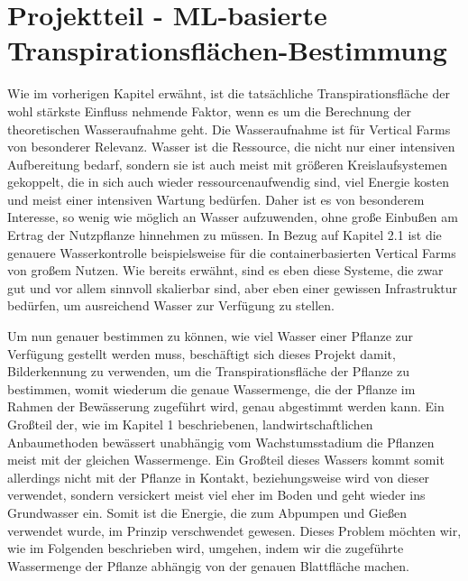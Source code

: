 \section{Projektteil - ML-basierte Transpirationsflächen-Bestimmung}
Wie im vorherigen Kapitel erwähnt, ist die tatsächliche Transpirationsfläche der wohl stärkste Einfluss nehmende Faktor, wenn es um die Berechnung der theoretischen Wasseraufnahme geht. Die Wasseraufnahme ist für Vertical Farms von besonderer Relevanz. Wasser ist die Ressource, die nicht nur einer intensiven Aufbereitung bedarf, sondern sie ist auch meist mit größeren Kreislaufsystemen gekoppelt, die in sich auch wieder ressourcenaufwendig sind, viel Energie kosten und meist einer intensiven Wartung bedürfen. Daher ist es von besonderem Interesse, so wenig wie möglich an Wasser aufzuwenden, ohne große Einbußen am Ertrag der Nutzpflanze hinnehmen zu müssen. In Bezug auf Kapitel 2.1 ist die genauere Wasserkontrolle beispielsweise für die containerbasierten Vertical Farms von großem Nutzen. Wie bereits erwähnt, sind es eben diese Systeme, die zwar gut und vor allem sinnvoll skalierbar sind, aber eben einer gewissen Infrastruktur bedürfen, um ausreichend Wasser zur Verfügung zu stellen. \newline \par
Um nun genauer bestimmen zu können, wie viel Wasser einer Pflanze zur Verfügung gestellt werden muss, beschäftigt sich dieses Projekt damit, Bilderkennung zu verwenden, um die Transpirationsfläche der Pflanze zu bestimmen, womit wiederum die genaue Wassermenge, die der Pflanze im Rahmen der Bewässerung zugeführt wird, genau abgestimmt werden kann. Ein Großteil der, wie im Kapitel 1 beschriebenen, landwirtschaftlichen Anbaumethoden bewässert unabhängig vom Wachstumsstadium die Pflanzen meist mit der gleichen Wassermenge. Ein Großteil dieses Wassers kommt somit allerdings nicht mit der Pflanze in Kontakt, beziehungsweise wird von dieser verwendet, sondern versickert meist viel eher im Boden und geht wieder ins Grundwasser ein. Somit ist die Energie, die zum Abpumpen und Gießen verwendet wurde, im Prinzip verschwendet gewesen. Dieses Problem möchten wir, wie im Folgenden beschrieben wird, umgehen, indem wir die zugeführte Wassermenge der Pflanze abhängig von der genauen Blattfläche machen.
